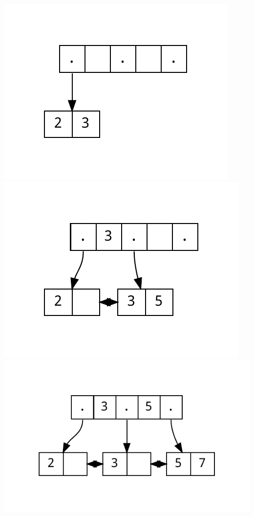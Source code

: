 \documentclass{uni_tue_template}
\begin{document}
  \includegraphics[scale=0.4]{./dot/A1_1-02.pdf}\\
  \includegraphics[scale=0.4]{./dot/A1_1-03.pdf}\\
  \includegraphics[scale=0.4]{./dot/A1_1-04.pdf}\\
\end{document}
